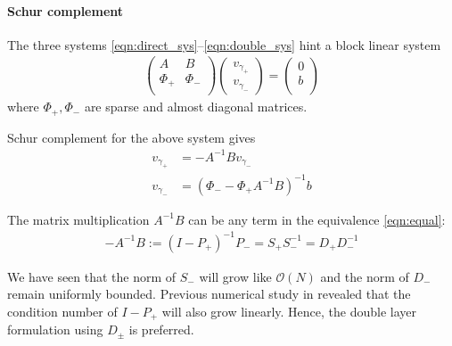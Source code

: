 \paragraph{Schur complement}

The three systems \eqref{eqn:direct_sys}--\eqref{eqn:double_sys} hint a block linear system
\begin{align}
\left(
\begin{array}{cc}
A & B \\
\Phi_+ & \Phi_- \\
\end{array}
\right)
\left(
\begin{array}{c}
v_{\gamma_+}\\
v_{\gamma_-}
\end{array}
\right)
=
\left(
\begin{array}{c}
0 \\
b \\
\end{array}
\right)
\end{align}
where $\Phi_+, \Phi_-$ are sparse and almost diagonal matrices.

Schur complement for the above system gives
\begin{subequations}
\begin{align}
v_{\gamma_+} &= -A^{-1}Bv_{\gamma_-}\\
v_{\gamma_-} &= (\Phi_--\Phi_+A^{-1}B)^{-1}b
\end{align}
\end{subequations}

The matrix multiplication $A^{-1}B$ can be any term in the equivalence \eqref{eqn:equal}:
\begin{align}
-A^{-1}B:=(I-P_+)^{-1}P_- = S_+S_{-}^{-1}=D_+D_{-}^{-1}
\end{align}

We have seen that the norm of $S_-$ will grow like $\mathcal{O}(N)$ and the norm of $D_-$ remain uniformly bounded. Previous numerical study in \cite{xia2023local} revealed that the condition number of $I-P_+$ will also grow linearly. Hence, the double layer formulation using $D_\pm$ is preferred.

